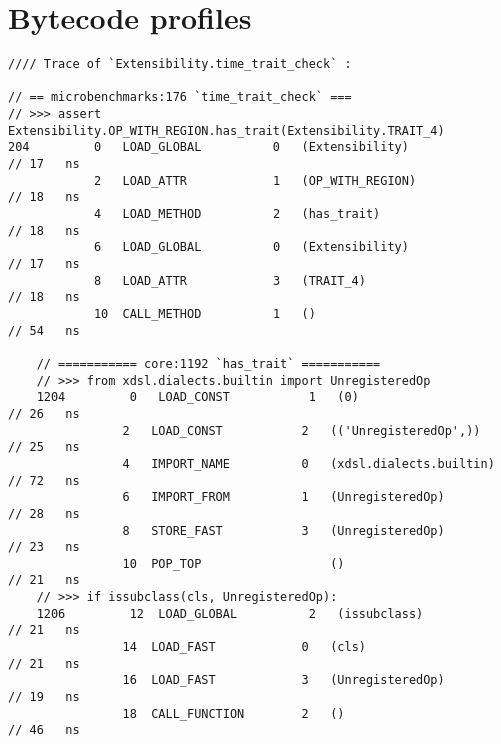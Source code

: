 \chapter{Bytecode profiles}
\label{chap:bytecode-profiles}

\begin{code}
    \begin{verbatim}
//// Trace of `Extensibility.time_trait_check` :

// == microbenchmarks:176 `time_trait_check` ===
// >>> assert Extensibility.OP_WITH_REGION.has_trait(Extensibility.TRAIT_4)
204         0   LOAD_GLOBAL          0   (Extensibility)                                            // 17   ns
            2   LOAD_ATTR            1   (OP_WITH_REGION)                                           // 18   ns
            4   LOAD_METHOD          2   (has_trait)                                                // 18   ns
            6   LOAD_GLOBAL          0   (Extensibility)                                            // 17   ns
            8   LOAD_ATTR            3   (TRAIT_4)                                                  // 18   ns
            10  CALL_METHOD          1   ()                                                         // 54   ns

    // =========== core:1192 `has_trait` ===========
    // >>> from xdsl.dialects.builtin import UnregisteredOp
    1204         0   LOAD_CONST           1   (0)                                                   // 26   ns
                2   LOAD_CONST           2   (('UnregisteredOp',))                                  // 25   ns
                4   IMPORT_NAME          0   (xdsl.dialects.builtin)                                // 72   ns
                6   IMPORT_FROM          1   (UnregisteredOp)                                       // 28   ns
                8   STORE_FAST           3   (UnregisteredOp)                                       // 23   ns
                10  POP_TOP                  ()                                                     // 21   ns
    // >>> if issubclass(cls, UnregisteredOp):
    1206         12  LOAD_GLOBAL          2   (issubclass)                                          // 21   ns
                14  LOAD_FAST            0   (cls)                                                  // 21   ns
                16  LOAD_FAST            3   (UnregisteredOp)                                       // 19   ns
                18  CALL_FUNCTION        2   ()                                                     // 46   ns


\end{verbatim}
\end{code}
